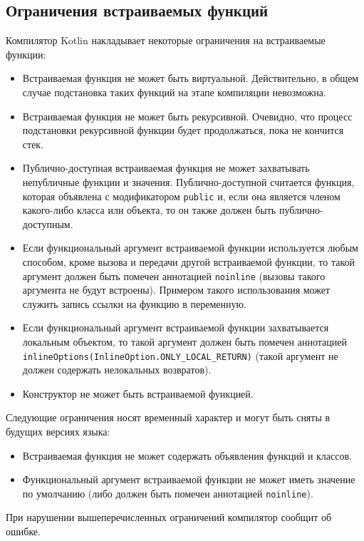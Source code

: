\subsection{Ограничения встраиваемых функций}

Компилятор Kotlin накладывает некоторые ограничения на встраиваемые
функции:
\begin{itemize}
  \item Встраиваемая функция не может быть виртуальной. Действительно,
  в общем случае подстановка таких функций
  на этапе компиляции невозможна.
  \item Встраиваемая функция не может быть рекурсивной. Очевидно, что
  процесс подстановки рекурсивной функции будет продолжаться,
  пока не кончится стек.
  \item Публично-доступная встраиваемая функция не может захватывать
  непубличные функции и значения.
  Публично-доступной считается функция, которая объявлена с модификатором
  \texttt{public} и, если она является членом какого-либо
  класса или объекта, то он также должен быть публично-доступным.
  \item Если функциональный аргумент
  встраиваемой функции используется любым способом, кроме
  вызова и передачи другой встраиваемой функции, то такой аргумент должен быть помечен
  аннотацией \texttt{noinline} (вызовы такого аргумента не будут
  встроены). Примером такого использования может служить запись
  ссылки на функцию в переменную.
  \item Если функциональный аргумент встраиваемой функции захватывается
  локальным объектом, то такой аргумент должен быть помечен аннотацией
\\  \texttt{inlineOptions(InlineOption.ONLY\_LOCAL\_RETURN)} (такой аргумент
  не должен содержать нелокальных возвратов).
  \item Конструктор не может быть встраиваемой функцией.
\end{itemize}

Следующие ограничения носят временный характер и могут быть сняты
в будущих версиях языка:
\begin{itemize}
  \item Встраиваемая функция не может содержать объявления функций и классов.
  \item Функциональный аргумент встраиваемой функции не может
    иметь значение по умолчанию (либо должен быть помечен аннотацией
    \texttt{noinline}).
\end{itemize}

При нарушении вышеперечисленных ограничений компилятор сообщит об ошибке.

